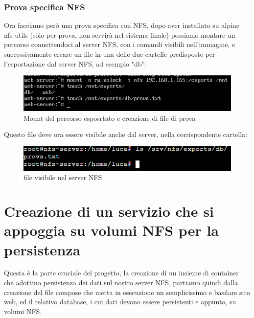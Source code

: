 \documentclass[a4paper]{article}
\begin{document}
\subsubsection{Prova specifica NFS}
Ora facciamo però una prova specifica con NFS, dopo aver installato su alpine nfs-utils (solo per prova, non servirà nel sistema finale)
possiamo montare un percorso connettendoci al server NFS, con i comandi visibili nell'immagine, e successivamente creare un file in una delle
due cartelle predisposte per l'esportazione dal server NFS, ad esempio "db":
\begin{figure}[H]
    \centering
    \includegraphics[scale=0.8]{images/ProvaNFS.png}
    \caption{Mount del percorso esposrtato e creazione di file di prova}
\end{figure}
Questo file deve ora essere visibile anche dal server, nella corrispondente cartella:
\begin{figure}[H]
    \centering
    \includegraphics[scale=0.9]{images/NFSFunziona.png}
    \caption{file visibile nel server NFS}
\end{figure}
\section{Creazione di un servizio che si appoggia su volumi NFS per la persistenza}
Questa è la parte cruciale del progetto, la creazione di un insieme di container che adottino
persistenza dei dati sul nostro server NFS, partiamo quindi dalla creazione del file compose
che metta in esecuzione un semplicissimo e basilare sito web, ed il relativo database, i cui dati
devono essere persistenti e appunto, su volumi NFS.
\end{document}
